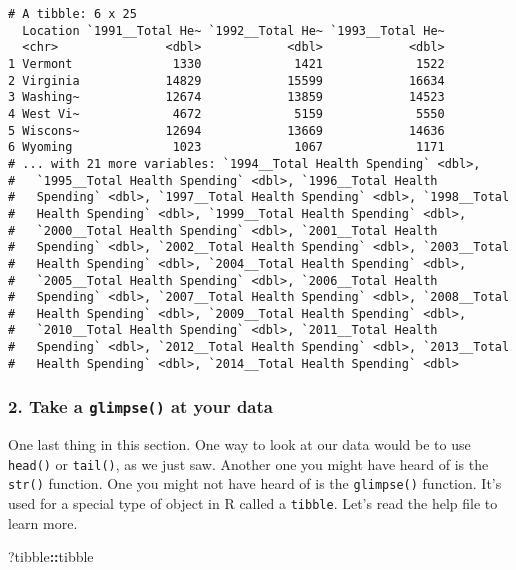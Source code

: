 \documentclass[]{article}
\newenvironment{Shaded}{\begin{snugshade}}{\end{snugshade}}
\newcommand{\NormalTok}[1]{#1}
\newcommand{\OperatorTok}[1]{\textcolor[rgb]{0.81,0.36,0.00}{\textbf{#1}}}
\begin{document}
\begin{verbatim}
# A tibble: 6 x 25
  Location `1991__Total He~ `1992__Total He~ `1993__Total He~
  <chr>               <dbl>            <dbl>            <dbl>
1 Vermont              1330             1421             1522
2 Virginia            14829            15599            16634
3 Washing~            12674            13859            14523
4 West Vi~             4672             5159             5550
5 Wiscons~            12694            13669            14636
6 Wyoming              1023             1067             1171
# ... with 21 more variables: `1994__Total Health Spending` <dbl>,
#   `1995__Total Health Spending` <dbl>, `1996__Total Health
#   Spending` <dbl>, `1997__Total Health Spending` <dbl>, `1998__Total
#   Health Spending` <dbl>, `1999__Total Health Spending` <dbl>,
#   `2000__Total Health Spending` <dbl>, `2001__Total Health
#   Spending` <dbl>, `2002__Total Health Spending` <dbl>, `2003__Total
#   Health Spending` <dbl>, `2004__Total Health Spending` <dbl>,
#   `2005__Total Health Spending` <dbl>, `2006__Total Health
#   Spending` <dbl>, `2007__Total Health Spending` <dbl>, `2008__Total
#   Health Spending` <dbl>, `2009__Total Health Spending` <dbl>,
#   `2010__Total Health Spending` <dbl>, `2011__Total Health
#   Spending` <dbl>, `2012__Total Health Spending` <dbl>, `2013__Total
#   Health Spending` <dbl>, `2014__Total Health Spending` <dbl>
\end{verbatim}

\hypertarget{take-a-glimpse-at-your-data}{%
\subsubsection{\texorpdfstring{2. Take a \texttt{glimpse()} at your
data}{2. Take a glimpse() at your data}}\label{take-a-glimpse-at-your-data}}

One last thing in this section. One way to look at our data would be to
use \texttt{head()} or \texttt{tail()}, as we just saw. Another one you
might have heard of is the \texttt{str()} function. One you might not
have heard of is the \texttt{glimpse()} function. It's used for a
special type of object in R called a \texttt{tibble}. Let's read the
help file to learn more.

\begin{Shaded}
\begin{Highlighting}[]
\NormalTok{?tibble}\OperatorTok{::}\NormalTok{tibble}
\end{Highlighting}
\end{Shaded}
\end{document}
